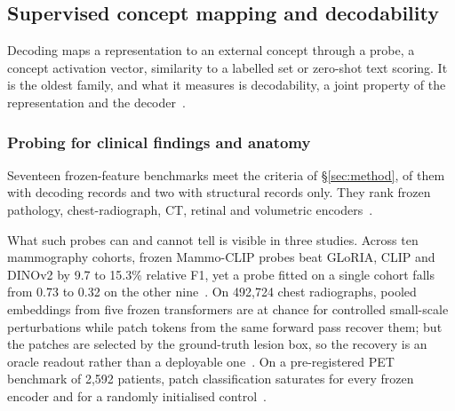 \subsection{Supervised concept mapping and decodability}
\label{sec:decoding}

Decoding maps a representation to an external concept through a probe, a concept activation vector,
similarity to a labelled set or zero-shot text scoring. It is the oldest family, and what it measures is
decodability, a joint property of the representation and the
decoder~\cite{alain2016understanding,belinkov2021probing,hewitt2019designing,elazar2020amnesic}.

\subsubsection{Probing for clinical findings and anatomy}

Seventeen frozen-feature benchmarks meet the criteria of \S\ref{sec:method}, \Nbenchdec{} of them with
decoding records and two with structural records only. They rank frozen pathology, chest-radiograph, CT,
retinal and volumetric
encoders~\cite{neidlinger2025benchmark,marza2025thunder,li2025featurequality,li2025embeddings,chevli2026frozenct,zhou2025generalist,aerts2025foundation}.

What such probes can and cannot tell is visible in three studies. Across ten mammography cohorts, frozen
Mammo-CLIP probes beat GLoRIA, CLIP and DINOv2 by 9.7 to 15.3\% relative F1, yet a probe fitted on a
single cohort falls from 0.73 to 0.32 on the other nine~\cite{germani2025bias}. On 492,724 chest
radiographs, pooled embeddings from five frozen transformers are at chance for controlled small-scale
perturbations while patch tokens from the same forward pass recover them; but the patches are selected by
the ground-truth lesion box, so the recovery is an oracle readout rather than a deployable
one~\cite{muthyala2026frozen}. On a pre-registered PET benchmark of 2,592 patients, patch classification
saturates for every frozen encoder and for a randomly initialised control~\cite{farquhar2026pretraining}.

